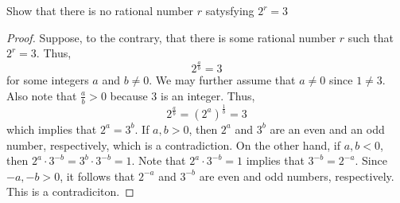 \documentclass[12pt]{article}
\newenvironment{problem}[2][Problem]{\begin{trivlist}
		\item[\hskip \labelsep {\bfseries #1}\hskip \labelsep {\bfseries #2.}]}{\end{trivlist}}
\begin{document}
	\begin{problem}{1.2.2}
		Show that there is no rational number $r$ satysfying $2^{r} = 3$
		\begin{proof}
			Suppose, to the contrary, that there is some rational number $r$ such that $2^{r} = 3$. Thus, 
			\begin{equation*}
				2^{\frac{a}{b}} = 3
			\end{equation*}
			 for some integers $a$ and $b\neq 0$. We may further assume that $a\neq 0$ since $1\neq 3$. Also note that $\frac{a}{b}>0$ because $3$ is an integer. Thus,
			 \begin{equation*}
			 	2^{\frac{a}{b}} = \left(2^{a}\right)^{\frac{1}{b}} =3
			 \end{equation*}
		 which implies that $2^{a} = 3^{b}$. If $a,b>0$, then $2^{a}$ and $3^{b}$ are an even and an odd number, respectively, which is a contradiction. On the other hand, if $a,b<0$, then $2^{a} \cdot 3^{-b}= 3^{b} \cdot 3^{-b} = 1$. Note that $2^{a}\cdot 3^{-b} = 1$ implies that $3^{-b} = 2^{-a}$. Since $-a,-b>0$, it follows that $2^{-a}$ and $3^{-b}$ are even and odd numbers, respectively. This is a contradiciton.
		\end{proof}
	\end{problem}
\end{document}
